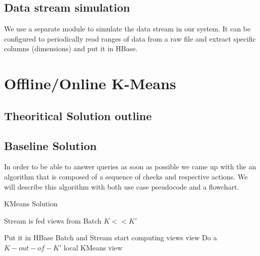\documentclass{lmproj}
\begin{document}
\section{Data stream simulation}
\label{systemdescr}
We use a separate module to simulate the data stream in our system. It can be configured to periodically read ranges of data from a raw file and extract specific columns (dimensions) and put it in HBase. 



\chapter{Offline/Online K-Means}
\label{kmeans}

\section{Theoritical Solution outline}
\label{kmeans}

\section{Baseline Solution}
\label{kmeans}

In order to be able to answer queries as soon as possible we came up with the an algorithm that is composed of a sequence of checks and respective actions. We will describe this algorithm with both use case pseudocode and a flowchart.


\bigskip


	\begin{algorithm}[H]
		\caption{KMeans Solution}\label{kmeanssolution}
		\begin{algorithmic}[1]
			\Require Stream is fed views from Batch
			\Require $K<<K'$
			
				\State Put it in HBase
				\State Batch and Stream start computing views
			\Else 
					\State \Return view
				\Else 
					\State Do a $K-out-of-K'$ local KMeans
					\State \Return view
				\EndIf
			\EndIf			
			
			\EndProcedure
		\end{algorithmic}
	\end{algorithm}
\end{document}
